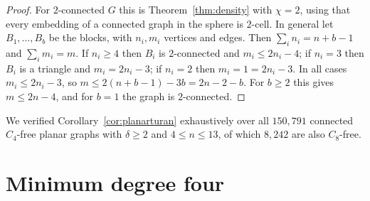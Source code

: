 \documentclass[11pt]{article}
\theoremstyle{plain}
\theoremstyle{definition}
\newcommand{\Cfour}{C_4}
\newcommand{\Ceight}{C_8}
\begin{document}
\begin{proof}
For $2$-connected $G$ this is Theorem~\ref{thm:density} with $\chi=2$, using that
every embedding of a connected graph in the sphere is $2$-cell. In general let
$B_1,\dots,B_b$ be the blocks, with $n_i,m_i$ vertices and edges. Then
$\sum_i n_i=n+b-1$ and $\sum_i m_i=m$. If $n_i\ge4$ then $B_i$ is $2$-connected
and $m_i\le 2n_i-4$; if $n_i=3$ then $B_i$ is a triangle and $m_i=2n_i-3$; if
$n_i=2$ then $m_i=1=2n_i-3$. In all cases $m_i\le 2n_i-3$, so
$m\le 2(n+b-1)-3b=2n-2-b$. For $b\ge2$ this gives $m\le 2n-4$, and for $b=1$ the
graph is $2$-connected.
\end{proof}

We verified Corollary~\ref{cor:planarturan} exhaustively over all $150{,}791$
connected $\Cfour$-free planar graphs with $\delta\ge2$ and $4\le n\le13$, of
which $8{,}242$ are also $\Ceight$-free.

\section{Minimum degree four}
\end{document}
